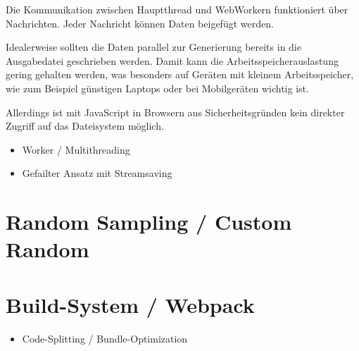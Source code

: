 Die Kommunikation zwischen Hauptthread und WebWorkern funktioniert über Nachrichten. Jeder Nachricht können Daten beigefügt werden.


Idealerweise sollten die Daten parallel zur Generierung bereits in die Ausgabedatei geschrieben werden. Damit kann die Arbeitsspeicherauslastung gering gehalten werden, was besonders auf Geräten mit kleinem Arbeitsspeicher, wie zum Beispiel günstigen Laptops oder bei Mobilgeräten wichtig ist.

Allerdings ist mit JavaScript in Browsern aus Sicherheitsgründen kein direkter Zugriff auf das Dateisystem möglich. 

\begin{itemize}
    \item Worker / Multithreading
    \item Gefailter Ansatz mit Streamsaving
\end{itemize}

\section{Random Sampling / Custom Random}

\section{Build-System / Webpack}
\begin{itemize}
    \item Code-Splitting / Bundle-Optimization
\end{itemize}